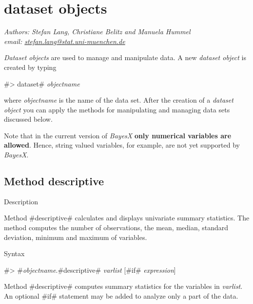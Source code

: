 \chapter{dataset objects} \label{chap_data}
\label{datasetobj}  

{\em Authors: Stefan Lang, Christiane Belitz and Manuela Hummel}   \\
{\em email: \href{mailto:stefan.lang@stat.uni-muenchen.de}{stefan.lang@stat.uni-muenchen.de}}\\
\vspace{0.3cm}


{\em Dataset objects} are used to manage and manipulate data. A new {\em dataset object} is created by typing

#> dataset# {\em objectname}

where {\em objectname} is the name of the data set. After the
creation of a {\em dataset object} you can apply the methods for
manipulating and managing data sets discussed below.

Note that in the current version of {\em BayesX} {\bf only
numerical variables are allowed}. Hence, string valued variables,
for example,  are not yet supported by {\em BayesX}.



\clearpage



\section{Method descriptive}
\label{descriptive} 
 

\begin{stanza}{Description}

{Method #descriptive# calculates and displays univariate summary
statistics. The method computes the number of observations, the
mean, median, standard deviation, minimum and maximum of
variables.}
\end{stanza}

\begin{stanza}{Syntax}

{#> #{\em objectname}.#descriptive# {\em varlist} [#if# {\em expression}]

Method #descriptive# computes summary statistics for the variables
in {\em varlist}. An optional #if# statement may be added to
analyze only a part of the data.}
\end{stanza}

